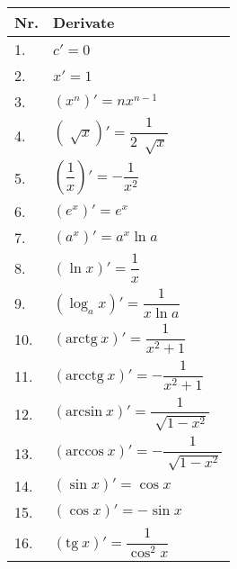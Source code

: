 \documentclass{article}
\begin{document}
\setlength{\extrarowheight}{10pt}

\begin{table}[!ht]
  \begin{minipage}{0.5\linewidth}
    \centering
    \begin{tabular}{|m{1cm}|m{4cm}|}
      \hline
      \textbf{Nr.} & \textbf{Derivate}                                               \\
      \hline
      1.           & $c' = 0$                                                        \\
      \hline
      2.           & $x' = 1$                                                        \\
      \hline
      3.           & $\left(x^n\right)' = nx^{n-1}$                                  \\
      \hline
      4.           & $\left(\sqrt[]{x}\right)' = \dfrac{1}{2\ \sqrt[]{x}}$           \\
      \hline
      5.           & $\left(\dfrac{1}{x}\right)' = -\dfrac{1}{x^2}$                  \\
      \hline
      6.           & $\left(e^x\right)' = e^x$                                       \\
      \hline
      7.           & $\left(a^x\right)' = a^x \ln a$                                 \\
      \hline
      8.           & $\left(\ln x\right)' = \dfrac{1}{x}$                            \\
      \hline
      9.           & $\left(\log_a x\right)' = \dfrac{1}{x\ln a}$                    \\
      \hline
      10.          & $\left(\text{arctg}\ x\right)' = \dfrac{1}{x^2+1}$              \\
      \hline
      11.          & $\left(\text{arcctg}\ x\right)' = -\dfrac{1}{x^2+1}$            \\
      \hline
      12.          & $\left(\text{arcsin}\ x\right)' = \dfrac{1}{\sqrt[]{1-x^2}}$    \\
      \hline
      13.          & $\left(\text{arccos}\ x\right)' = -\dfrac{1}{\sqrt[]{1-x^2}}$   \\
      \hline
      14.          & $\left(\sin x\right)' = \cos x$                                 \\
      \hline
      15.          & $\left(\cos x\right)' = -\sin x$                                \\
      \hline
      16.          & $\left(\text{tg}\ x\right)' = \dfrac{1}{\cos ^2 x}$             \\

\end{tabular}
\end{minipage}
\end{table}
\end{document}
